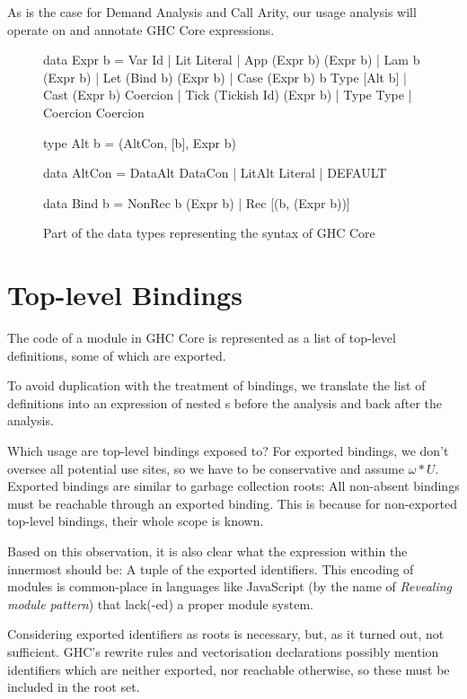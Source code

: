 As is the case for Demand Analysis and Call Arity, our usage analysis will operate on and annotate GHC Core expressions.

\begin{figure}[h]
  \begin{haskellcode}
    data Expr b
      = Var      Id
      | Lit      Literal
      | App      (Expr b) (Expr b)
      | Lam      b (Expr b)
      | Let      (Bind b) (Expr b)
      | Case     (Expr b) b Type [Alt b]
      | Cast     (Expr b) Coercion
      | Tick     (Tickish Id) (Expr b)
      | Type     Type
      | Coercion Coercion

    type Alt b = (AltCon, [b], Expr b)

    data AltCon
      = DataAlt DataCon
      | LitAlt  Literal
      | DEFAULT 

    data Bind b 
      = NonRec b (Expr b)
      | Rec [(b, (Expr b))]
  \end{haskellcode}
  \caption{Part of the data types representing the syntax of GHC Core}
  \label{fig:core}
\end{figure}

\section{Top-level Bindings}\label{sec:toplvl}

The code of a module in GHC Core is represented as a list of top-level definitions, some of which are exported.

To avoid duplication with the treatment of  bindings, we translate the list of definitions into an expression of nested s before the analysis and back after the analysis.

Which usage are top-level bindings exposed to? 
For exported bindings, we don't oversee all potential use sites, so we have to be conservative and assume $\omega*U$. 
Exported bindings are similar to garbage collection roots: 
All non-absent bindings must be reachable through an exported binding. 
This is because for non-exported top-level bindings, their whole scope is known.

Based on this observation, it is also clear what the expression within the innermost  should be: A tuple of the exported identifiers.
This encoding of modules is common-place in languages like JavaScript (by the name of \emph{Revealing module pattern}) that lack(-ed) a proper module system.

Considering exported identifiers as roots is necessary, but, as it turned out, not sufficient.
GHC's rewrite rules and vectorisation declarations possibly mention identifiers which are neither exported, nor reachable otherwise, so these must be included in the root set.

